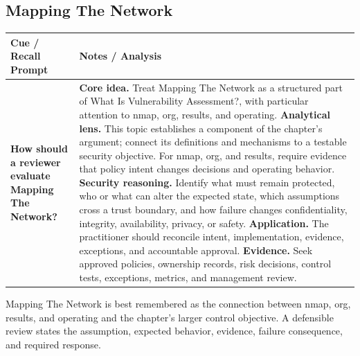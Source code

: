\documentclass[11pt]{article}
\newcommand{\CornellHeader}{%
\rowcolor{Navy}\color{white}\bfseries Cue / Recall Prompt & \color{white}\bfseries Notes / Analysis\\\hline}
\newcommand{\CornellRow}[2]{%
\cellcolor{CueGray}\RaggedRight\textbf{#1} & \RaggedRight #2\\\hline}
\begin{document}
\subsection*{Mapping The Network}
\begin{longtable}{>{\RaggedRight\arraybackslash}p{}|>{\RaggedRight\arraybackslash}p{}}
\CornellHeader
\CornellRow{How should a reviewer evaluate Mapping The Network?}{\textbf{Core idea.} Treat Mapping The Network as a structured part of What Is Vulnerability Assessment?, with particular attention to nmap, org, results, and operating. \textbf{Analytical lens.} This topic establishes a component of the chapter's argument; connect its definitions and mechanisms to a testable security objective. For nmap, org, and results, require evidence that policy intent changes decisions and operating behavior. \textbf{Security reasoning.} Identify what must remain protected, who or what can alter the expected state, which assumptions cross a trust boundary, and how failure changes confidentiality, integrity, availability, privacy, or safety. \textbf{Application.} The practitioner should reconcile intent, implementation, evidence, exceptions, and accountable approval. \textbf{Evidence.} Seek approved policies, ownership records, risk decisions, control tests, exceptions, metrics, and management review.}
\end{longtable}
\begin{topicsummary}
Mapping The Network is best remembered as the connection between nmap, org, results, and operating and the chapter's larger control objective. A defensible review states the assumption, expected behavior, evidence, failure consequence, and required response.
\end{topicsummary}
\end{document}
